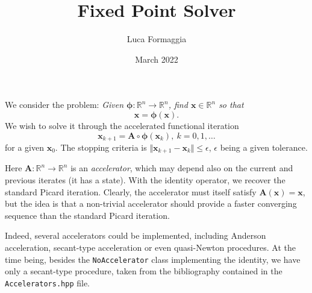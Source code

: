 \documentclass{article}
\author{Luca Formaggia}
\title{Fixed Point Solver}
\date{March 2022}
\begin{document}
\maketitle

We consider the problem: \emph{Given $\boldsymbol{\phi}:\mathbb{R}^n\to \mathbb{R}^n$, find $\mathbf{x}\in\mathbb{R}^n$ so that}
\begin{equation}
    \label{eq:fixedpoint}
        \mathbf{x}=\boldsymbol{\phi}(\mathbf{x}).
\end{equation}
We wish to solve it through the accelerated functional iteration
\begin{equation}
    \label{eq:picard}
    \mathbf{x}_{k+1}=\boldsymbol{A}\circ\boldsymbol{\phi}(\mathbf{x}_k),\  k=0,1,\ldots
\end{equation}
for a given $\mathbf{x}_0$. The stopping criteria is $\Vert\mathbf{x}_{k+1}- \mathbf{x}_k\Vert\le\epsilon$, $\epsilon$ being a given tolerance.

Here $\boldsymbol{A}:\mathbb{R}^n\to\mathbb{R}^n$ is an \emph{accelerator}, which may depend also on the current and previous iterates (it has a state). With the identity operator, we recover the standard Picard iteration. Clearly, the accelerator must itself
satisfy $\boldsymbol{A}(\mathbf{x})=\mathbf{x}$, but the idea is that a non-trivial accelerator
should provide a faster converging sequence than the standard Picard iteration.

Indeed, several accelerators could be implemented, including Anderson acceleration, secant-type acceleration or even quasi-Newton procedures. At the time being, besides the \texttt{NoAccelerator} class implementing the identity,  we have only a secant-type procedure, 
taken from the bibliography contained in the \texttt{Accelerators.hpp} file.
\end{document}
